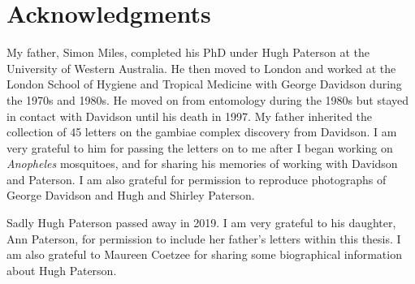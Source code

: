 \documentclass[a4paper,11pt,abstracton,hidelinks]{scrartcl}
\begin{document}
\section{Acknowledgments}


My father, Simon Miles, completed his PhD under Hugh Paterson at the University of Western Australia. 
%
He then moved to London and worked at the London School of Hygiene and Tropical Medicine with George Davidson during the 1970s and 1980s. 
%
He moved on from entomology during the 1980s but stayed in contact with Davidson until his death in 1997.
%
My father inherited the collection of 45 letters on the gambiae complex discovery from Davidson. 
%
I am very grateful to him for passing the letters on to me after I began working on \textit{Anopheles} mosquitoes, and for sharing his memories of working with Davidson and Paterson.
%
I am also grateful for permission to reproduce photographs of George Davidson and Hugh and Shirley Paterson.


Sadly Hugh Paterson passed away in 2019.
%
I am very grateful to his daughter, Ann Paterson, for permission to include her father's letters within this thesis.
%
I am also grateful to Maureen Coetzee for sharing some biographical information about Hugh Paterson.
%


\printbibliography
\end{document}
